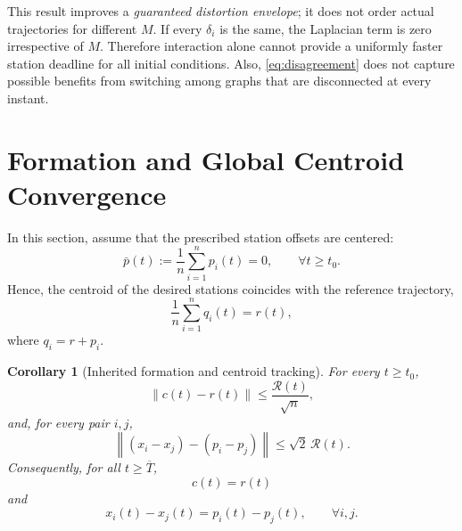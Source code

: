 \documentclass[11pt,a4paper]{article}
\newtheorem{corollary}{Corollary}
\theoremstyle{remark}
\newcommand{\norm}[1]{\left\lVert#1\right\rVert}
\newcommand{\env}{\mathcal R}
\begin{document}
This result improves a \emph{guaranteed distortion envelope}; it does not order actual trajectories for different $M$. If every $\delta_i$ is the same, the Laplacian term is zero irrespective of $M$. Therefore interaction alone cannot provide a uniformly faster station deadline for all initial conditions. Also, \eqref{eq:disagreement} does not capture possible benefits from switching among graphs that are disconnected at every instant.

\section{Formation and Global Centroid Convergence}

In this section, assume that the prescribed station offsets are centered:
\begin{equation}
\bar p(t):=\frac{1}{n}\sum_{i=1}^{n} p_i(t)=0,
\qquad \forall t\ge t_0.
\label{eq:centered-offsets}
\end{equation}
Hence, the centroid of the desired stations coincides with the reference trajectory,
\begin{equation}
\frac{1}{n}\sum_{i=1}^{n} q_i(t)
=
r(t),
\end{equation}
where $q_i=r+p_i$.

\begin{corollary}[Inherited formation and centroid tracking]
For every $t\ge t_0$,
\begin{equation}
\norm{c(t)-r(t)}
\le
\frac{\env(t)}{\sqrt n},
\label{eq:centroid-bound}
\end{equation}
and, for every pair $i,j$,
\begin{equation}
\norm{(x_i-x_j)-(p_i-p_j)}
\le
\sqrt{2}\,\env(t).
\label{eq:formation-bound}
\end{equation}
Consequently, for all $t\ge\overline T$,
\begin{equation}
c(t)=r(t)
\end{equation}
and
\begin{equation}
x_i(t)-x_j(t)
=
p_i(t)-p_j(t),
\qquad \forall i,j.
\end{equation}
\end{corollary}
\end{document}
